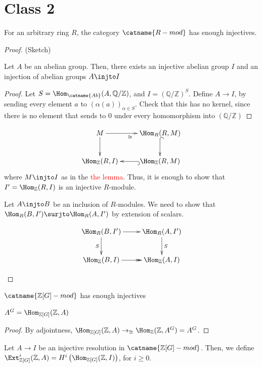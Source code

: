 \documentclass[12pt]{scrartcl}
\begin{document}
\section{Class 2}
\begin{theorem}
For an arbitrary ring $R$, the category $\catname{R-mod}$ has enough injectives.
\end{theorem}
\begin{proof}
	(Sketch)
	\begin{lemma}
	Let $A$ be an abelian group.
	Then, there exists an injective abelian group $I$ and an injection of abelian groups $A \injto I$  
	\end{lemma}
	\begin{proof}
	Let $S = \Hom_{\catname{Ab}}(A, \mathbb{Q}/\mathbb{Z})$, and $I = \left(\mathbb{Q}/\mathbb{Z}\right)^S$.
	Define $A \to I$, by sending every element $a$ to $ \left(\alpha(a)\right)_{\alpha \in S}$.
	Check that this has no kernel, since there is no element that sends to $0$ under every homomorphism into $\left(\mathbb{Q}/\mathbb{Z}\right)$  
	\end{proof}
\[
	\begin{array}{c}
\xymatrix{
	M \ar[r]_{\cong} \ar[d]& \Hom_R(R, M) \ar@{^{(}->}[d] \\
	\Hom_{\mathbb{Z}}(R, I) & \Hom_{\mathbb{Z}}(R, M) \ar@{^{(}->}[l] \\
}
\end{array}
\] 
where $M \injto I$ as in the \textcolor{red}{the lemma}. 
Thus, it is enough to show that $I' = \Hom_{\mathbb{Z}}(R, I)$ is an injective $R$-module.

\begin{proposition}
Let $A \injto B$ be an inclusion of $R$-modules.
We need to show that $\Hom_R(B, I') \surjto \Hom_R(A, I')$ by extension of scalars.

\[
	\begin{array}{c}
\xymatrix{
	\Hom_R(B, I') \ar[r] \ar[d]_{S} & \Hom_R(A, I') \ar[d]^{S} \\
	\Hom_{\mathbb{Z}}(B, I) \ar@{->>}[r]& \Hom_{\mathbb{Z}}(A, I) \\
}
\end{array}
\] 
\end{proposition}
\end{proof}
\begin{corollary}
	$\catname{\mathbb{Z}[G]-mod}$ has enough injectives 
\end{corollary}

\begin{lemma}
	$A^G = \Hom_{\mathbb{Z}[G]}(\mathbb{Z}, A)$
\end{lemma}
\begin{proof}
	By adjointness, $\Hom_{\mathbb{Z}[G]}(\mathbb{Z}, A) \to_{\cong} \Hom_{\mathbb{Z}}(\mathbb{Z}, A^G) = A^G$.
\end{proof}
Let $A \to I$ be an injective resolution in $\catname{\mathbb{Z}[G]-mod}$.
Then, we define $\Ext_{\mathbb{Z}[G]}^{i} (\mathbb{Z}, A) = H^i \left(\Hom_{\mathbb{Z}[G]}(\mathbb{Z}, I)\right)$, for $i \geq 0$.
\end{document}
